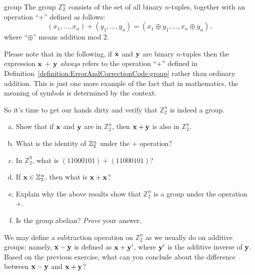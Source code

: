 \begin{defn}{group}
The group $\mathbb{Z}_2^n$ consists of the set of all binary $n$-tuples, together with an operation ``+'' defined as follows:
\[ (x_1, \ldots, x_n) +  (y_1, \ldots, y_n) = (x_1 \oplus y_1, \ldots, x_n \oplus y_n), \]
where ``$\oplus$'' means addition mod 2.
\end{defn}

\begin{rem}
Please note  that in the following, if  ${\bold x}$ and ${\bold y}$ are binary $n$-tuples then the expression ${\bold x}$ + ${\bold y}$ \emph{always} refers to the operation ``+'' defined in Definition~\ref{definition:ErrorAndCorrectionCode:group} rather than ordinary addition. This is just one more example of the fact that in mathematics, the meaning of symbols is determined by the context.
\end{rem}

So it's time to get our hands dirty and verify that 
$\mathbb{Z}_2^n$ is indeed a group.

\begin{exercise}{}
\begin{enumerate}[(a)]
\item
Show that if ${\bold x}$ and ${\bold y}$ are in $\mathbb{Z}_2^n$, then ${\bold x} + {\bold y}$ is also in $\mathbb{Z}_2^n$.
\item
What is the identity of ${\Bbb Z}_2^n$ under the + operation?
\item
In $\mathbb{Z}_2^9$, what is $(11000101) + (11000101)$?
\item
If ${\bold x} \in \mathbb{Z}_2^n$, then what is ${\bold x} + {\bold x}$?
\item
Explain why the above results show that $\mathbb{Z}_2^n$ is a group under the operation +.
\item
Is the group abelian? \emph{Prove} your answer.
\end{enumerate}
\end{exercise} 

\begin{exercise}{}
We may define a subtraction operation on $\mathbb{Z}_2^n$ as we usually do on additive groups: namely, ${\bold x} - {\bold y}$ is defined as ${\bold x} + {\bold y'}$, where ${\bold y'}$ is the additive inverse of ${\bold y}$.  Based on the previous exercise, what can you conclude about the difference between ${\bold x} - {\bold y}$ and ${\bold x} + {\bold y}$?
\end{exercise} 
  
